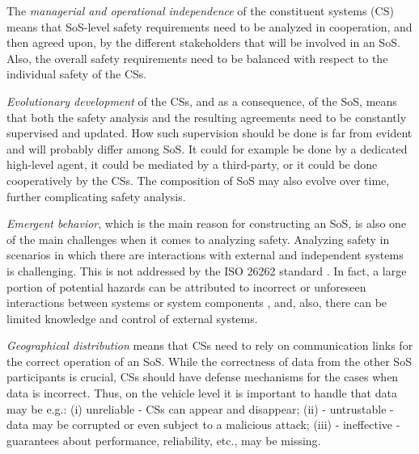 The \emph{managerial and operational independence} of the constituent systems (CS) means that SoS-level safety requirements need to be analyzed in cooperation, and then agreed upon, by the different stakeholders that will be involved in an SoS. Also, the overall safety requirements need to be balanced with respect to the individual safety of the CSs. 

\emph{Evolutionary development} of the CSs, and as a consequence, of the SoS, means that both the safety analysis and the resulting agreements need to be constantly supervised and updated. How such supervision should be done is far from evident and will probably differ among SoS. It could for example be done by a dedicated high-level agent, it could be mediated by a third-party, or it could be done cooperatively by the CSs. The composition of SoS may also evolve over time, further complicating safety analysis. 

\emph{Emergent behavior}, which is the main reason for constructing an SoS, is also one of the main challenges when it comes to analyzing safety. 
Analyzing safety in scenarios in which there are interactions with external and independent systems is challenging. This is not addressed by the ISO 26262 standard \cite{iso26262}. 
In fact, a large portion of potential hazards can be attributed to incorrect or unforeseen interactions between systems or system components \cite{rasmussen1997risk, leveson2011stamp}, and, also, there can be limited knowledge and control of external systems. 

\emph{Geographical distribution} means that CSs need to rely on communication links for the correct operation of an SoS. While the correctness of data from the other SoS participants is crucial, CSs should have defense mechanisms for the cases when data is incorrect. Thus, on the vehicle level it is important to handle that data may be e.g.: (i) unreliable - CSs can appear and disappear; (ii) - untrustable - data may be corrupted or even subject to a malicious attack; (iii) - ineffective - guarantees about performance, reliability, etc., may be missing. 

